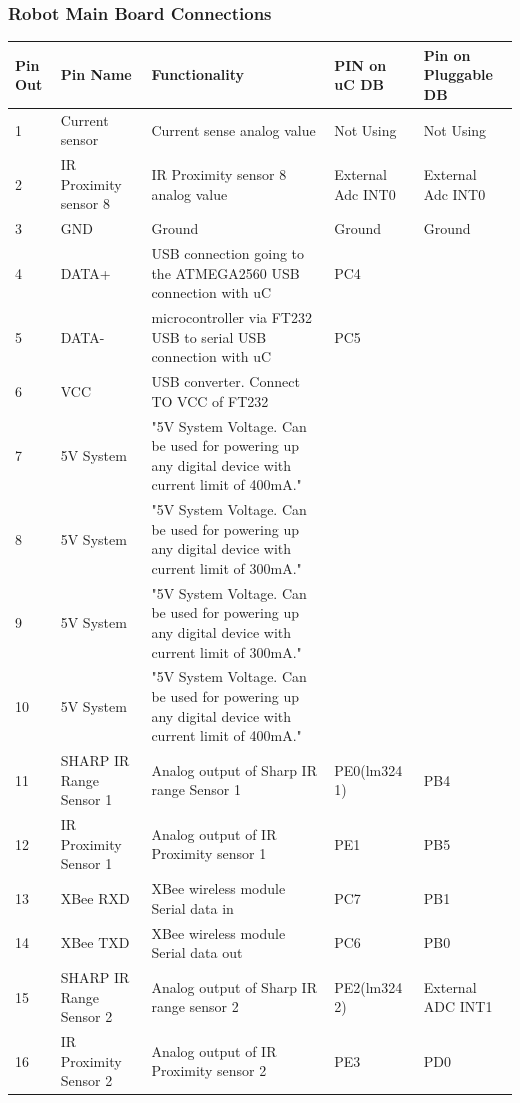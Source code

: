 \documentclass[a4paper,10pt,oneside]{article}
\begin{document}
{		\subsubsection{\Large\textbf{Robot Main Board Connections}}
			\begin{longtable}{|p{}|p{}|p{}|p{.1\textwidth}|p{}|}\hline
				Pin Out&	Pin Name&	Functionality&	PIN on uC DB& Pin on Pluggable DB\\ \hline
				1&	Current sensor&	Current sense analog value&	Not Using & Not Using\\ \hline
				2&	IR Proximity sensor 8&	IR Proximity sensor 8 analog value&	External Adc INT0&	External Adc INT0\\ \hline
				3&	GND&	Ground	&Ground & Ground\\ \hline
				4&	DATA+&	USB connection going to the ATMEGA2560	USB connection with uC & PC4 & \\ \hline
				5&	DATA-&	microcontroller via FT232 USB to serial	USB connection with uC &PC5 & \\ \hline
				6&	VCC& USB	converter.	Connect TO VCC of FT232& &\\ \hline
				7&	5V System&	"5V System Voltage. Can be used for powering
				up any digital device with current limit of
				400mA."	& &\\ \hline
				8&	5V System&	"5V System Voltage. Can be used for powering
				up any digital device with current limit of
				300mA."	& &\\ \hline
				9&	5V System&	"5V System Voltage. Can be used for powering
				up any digital device with current limit of
				300mA."	& &\\ \hline
				10&	5V System&	"5V System Voltage. Can be used for powering
				up any digital device with current limit of
				400mA."	& &\\ \hline
				11&	SHARP IR Range Sensor 1	&Analog output of Sharp IR range Sensor 1&	PE0(lm324 1) & PB4\\ \hline
				12&	IR Proximity Sensor 1&	Analog output of IR Proximity sensor 1&	PE1 & PB5\\ \hline
				13&	XBee RXD&	XBee wireless module Serial data in	&PC7 & PB1\\ \hline
				14&	XBee TXD&	XBee wireless module Serial data out&	PC6 & PB0\\ \hline
				15&	SHARP IR Range Sensor 2	& Analog output of Sharp IR range sensor 2&	PE2(lm324 2) & External ADC INT1\\ \hline
				16&	IR Proximity Sensor 2&	Analog output of IR Proximity sensor 2&	PE3 & PD0\\ \hline

\end{longtable}}
\end{document}
